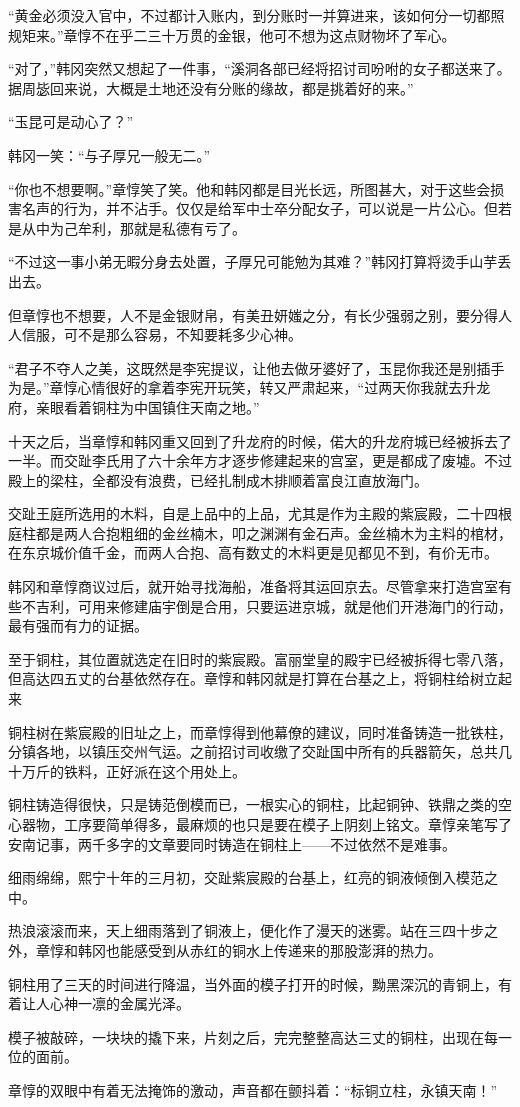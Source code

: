 “黄金必须没入官中，不过都计入账内，到分账时一并算进来，该如何分一切都照规矩来。”章惇不在乎二三十万贯的金银，他可不想为这点财物坏了军心。

“对了，”韩冈突然又想起了一件事，“溪洞各部已经将招讨司吩咐的女子都送来了。据周毖回来说，大概是土地还没有分账的缘故，都是挑着好的来。”

“玉昆可是动心了？”

韩冈一笑：“与子厚兄一般无二。”

“你也不想要啊。”章惇笑了笑。他和韩冈都是目光长远，所图甚大，对于这些会损害名声的行为，并不沾手。仅仅是给军中士卒分配女子，可以说是一片公心。但若是从中为己牟利，那就是私德有亏了。

“不过这一事小弟无暇分身去处置，子厚兄可能勉为其难？”韩冈打算将烫手山芋丢出去。

但章惇也不想要，人不是金银财帛，有美丑妍媸之分，有长少强弱之别，要分得人人信服，可不是那么容易，不知要耗多少心神。

“君子不夺人之美，这既然是李宪提议，让他去做牙婆好了，玉昆你我还是别插手为是。”章惇心情很好的拿着李宪开玩笑，转又严肃起来，“过两天你我就去升龙府，亲眼看着铜柱为中国镇住天南之地。”

十天之后，当章惇和韩冈重又回到了升龙府的时候，偌大的升龙府城已经被拆去了一半。而交趾李氏用了六十余年方才逐步修建起来的宫室，更是都成了废墟。不过殿上的梁柱，全都没有浪费，已经扎制成木排顺着富良江直放海门。

交趾王庭所选用的木料，自是上品中的上品，尤其是作为主殿的紫宸殿，二十四根庭柱都是两人合抱粗细的金丝楠木，叩之渊渊有金石声。金丝楠木为主料的棺材，在东京城价值千金，而两人合抱、高有数丈的木料更是见都见不到，有价无市。

韩冈和章惇商议过后，就开始寻找海船，准备将其运回京去。尽管拿来打造宫室有些不吉利，可用来修建庙宇倒是合用，只要运进京城，就是他们开港海门的行动，最有强而有力的证据。

至于铜柱，其位置就选定在旧时的紫宸殿。富丽堂皇的殿宇已经被拆得七零八落，但高达四五丈的台基依然存在。章惇和韩冈就是打算在台基之上，将铜柱给树立起来

铜柱树在紫宸殿的旧址之上，而章惇得到他幕僚的建议，同时准备铸造一批铁柱，分镇各地，以镇压交州气运。之前招讨司收缴了交趾国中所有的兵器箭矢，总共几十万斤的铁料，正好派在这个用处上。

铜柱铸造得很快，只是铸范倒模而已，一根实心的铜柱，比起铜钟、铁鼎之类的空心器物，工序要简单得多，最麻烦的也只是要在模子上阴刻上铭文。章惇亲笔写了安南记事，两千多字的文章要同时铸造在铜柱上——不过依然不是难事。

细雨绵绵，熙宁十年的三月初，交趾紫宸殿的台基上，红亮的铜液倾倒入模范之中。

热浪滚滚而来，天上细雨落到了铜液上，便化作了漫天的迷雾。站在三四十步之外，章惇和韩冈也能感受到从赤红的铜水上传递来的那股澎湃的热力。

铜柱用了三天的时间进行降温，当外面的模子打开的时候，黝黑深沉的青铜上，有着让人心神一凛的金属光泽。

模子被敲碎，一块块的撬下来，片刻之后，完完整整高达三丈的铜柱，出现在每一位的面前。

章惇的双眼中有着无法掩饰的激动，声音都在颤抖着：“标铜立柱，永镇天南！”

